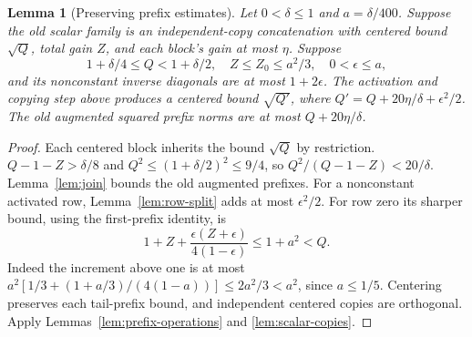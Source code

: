 \documentclass[reqno,a4paper,12pt]{amsart}
\newtheorem{lemma}[theorem]{Lemma}
\theoremstyle{definition}
\begin{document}
\begin{lemma}[Preserving prefix estimates]\label{lem:scalar-prefix-step}
Let $0<\delta\le1$ and $a=\delta/400$.
Suppose the old scalar family is an independent-copy concatenation
with centered bound $\sqrt Q$, total gain $Z$, and each block's gain
at most $\eta$. Suppose
\[
 1+\delta/4\le Q<1+\delta/2,\quad Z\le Z_0\le a^2/3,\quad
 0<\epsilon\le a,
\]
and its nonconstant inverse diagonals are at most $1+2\epsilon$.
The activation and copying step above produces a centered bound
$\sqrt{Q'}$, where
$Q'=Q+20\eta/\delta+\epsilon^2/2$.
The old augmented squared prefix norms are at most $Q+20\eta/\delta$.
\end{lemma}
\begin{proof}
Each centered block inherits the bound $\sqrt Q$ by restriction.
$Q-1-Z>\delta/8$ and $Q^2\le(1+\delta/2)^2\le9/4$, so
$Q^2/(Q-1-Z)<20/\delta$. Lemma~\ref{lem:join} bounds the old
augmented prefixes. For a nonconstant activated row,
Lemma~\ref{lem:row-split} adds at most $\epsilon^2/2$.
For row zero its sharper bound, using the first-prefix identity, is
\[
 1+Z+\frac{\epsilon(Z+\epsilon)}{4(1-\epsilon)}
 \le1+a^2<Q.
\]
Indeed the increment above one is at most
$a^2[1/3+(1+a/3)/(4(1-a))]\le2a^2/3<a^2$, since $a\le1/5$.
Centering preserves each tail-prefix bound, and independent centered
copies are orthogonal. Apply
Lemmas~\ref{lem:prefix-operations} and \ref{lem:scalar-copies}.
\end{proof}
\end{document}
